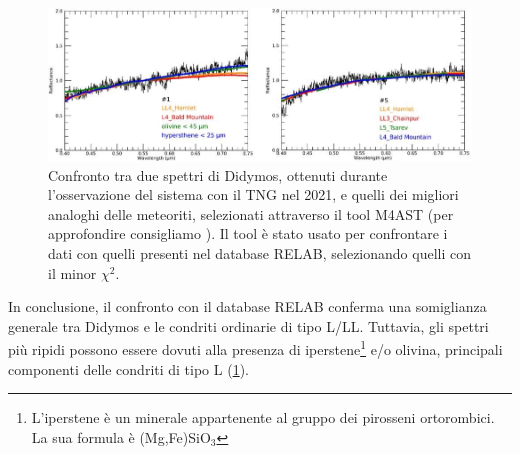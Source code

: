 \begin{figure}[!h]
    \centering
    \includegraphics[scale=0.96]{figure/Ieva et al.jpg}
    \caption[Confronto tra spettri di Didymos e analoghi delle meteoriti.]{Confronto tra due spettri di Didymos, ottenuti durante l'osservazione del sistema con il TNG nel 2021, e quelli dei migliori analoghi delle meteoriti, selezionati attraverso il tool M4AST (per approfondire consigliamo \cite{popescu_modelling_2012}). Il tool è stato usato per confrontare i dati con quelli presenti nel database RELAB, selezionando quelli con il minor $\chi^2$. \citep{ieva_spectral_2022}}
    \label{fig:ieva_spectra}
\end{figure}

In conclusione, il confronto con il database RELAB conferma una somiglianza generale tra Didymos e le condriti ordinarie di tipo L/LL. Tuttavia, gli spettri più ripidi possono essere dovuti alla presenza di iperstene\footnote{L'iperstene è un minerale appartenente al gruppo dei pirosseni ortorombici. La sua formula è (Mg,Fe)SiO$_3$} e/o olivina, principali componenti delle condriti di tipo L (\cref{fig:ieva_spectra}).


